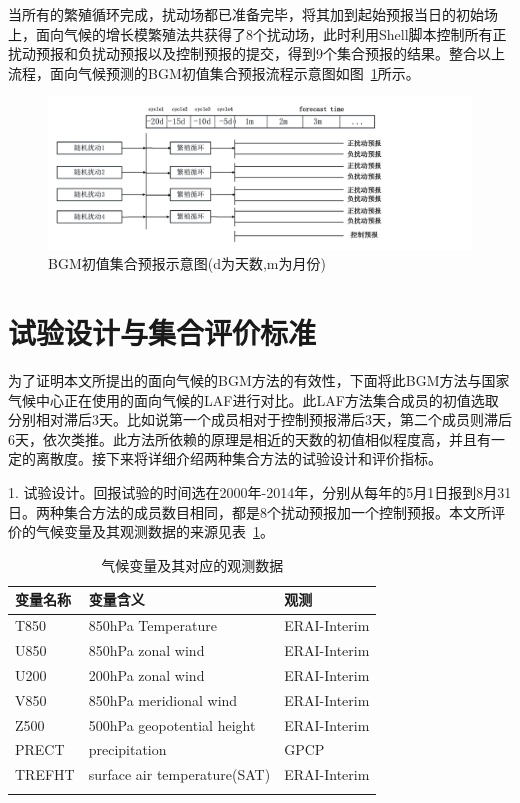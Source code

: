 当所有的繁殖循环完成，扰动场都已准备完毕，将其加到起始预报当日的初始场上，面向气候的增长模繁殖法共获得了8个扰动场，此时利用Shell脚本控制所有正扰动预报和负扰动预报以及控制预报的提交，得到9个集合预报的结果。整合以上流程，面向气候预测的BGM初值集合预报流程示意图如图~\ref{fig:bgm ensem fore}所示。

\begin{figure}[H] %
  \centering
  \includegraphics[scale =0.37]{figures/初值集合预报示意图.pdf}
  \caption{BGM初值集合预报示意图(d为天数,m为月份)}
  \label{fig:bgm ensem fore}
\end{figure}

\section{试验设计与集合评价标准}
为了证明本文所提出的面向气候的BGM方法的有效性，下面将此BGM方法与国家气候中心正在使用的面向气候的LAF进行对比。此LAF方法集合成员的初值选取分别相对滞后3天。比如说第一个成员相对于控制预报滞后3天，第二个成员则滞后6天，依次类推。此方法所依赖的原理是相近的天数的初值相似程度高，并且有一定的离散度。接下来将详细介绍两种集合方法的试验设计和评价指标。

1. 试验设计。回报试验的时间选在2000年-2014年，分别从每年的5月1日报到8月31日。两种集合方法的成员数目相同，都是8个扰动预报加一个控制预报。本文所评价的气候变量及其观测数据的来源见表~\ref{tab:eva varibles}。

\begin{table}[htb]
\centering
\caption{气候变量及其对应的观测数据}  
\begin{tabular}{lll}
\toprule[1.5pt]
变量名称 & 变量含义 & 观测\\  
\hline  
T850     & 850hPa Temperature   & ERAI-Interim\\
    U850   & 850hPa zonal wind  & ERAI-Interim\\
    U200    & 200hPa zonal wind    & ERAI-Interim\\
    V850     & 850hPa meridional wind   & ERAI-Interim\\
    Z500     & 500hPa geopotential height  & ERAI-Interim \\
    PRECT & precipitation & GPCP \\
    TREFHT & surface air temperature(SAT) & ERAI-Interim\\
\bottomrule[1.5pt] 
\label{tab:eva varibles}
\end{tabular}  
\end{table}


